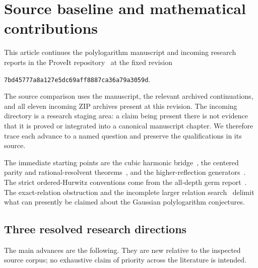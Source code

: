 \documentclass[11pt,a4paper]{article}
\numberwithin{equation}{section}
\theoremstyle{definition}
\theoremstyle{remark}
\newcommand{\snapshot}{\texttt{7bd45777a8a127e5dc69aff8887ca36a79a3059d}}
\begin{document}
\section{Source baseline and mathematical contributions}
\label{intro:scope}

This article continues the polylogarithm manuscript and incoming
research reports in the ProveIt repository~\cite{ProveIt} at the fixed
revision
\begin{center}\snapshot.\end{center}
The source comparison uses the manuscript, the relevant archived
continuations, and all eleven incoming ZIP archives present at this
revision. The incoming directory is a research staging area: a claim
being present there is not evidence that it is proved or integrated
into a canonical manuscript chapter. We therefore trace each advance
to a named question and preserve the qualifications in its source.

The immediate starting points are the cubic harmonic
bridge~\cite{IncomingCubic}, the centered parity and rational-resolvent
theorems~\cite{IncomingParity}, and the higher-reflection
generators~\cite{IncomingReflection}. The strict ordered-Hurwitz
conventions come from the all-depth germ report~\cite{IncomingOrdered}.
The exact-relation obstruction and the incomplete larger relation
search~\cite{IncomingExact,IncomingIndependent} delimit what can
presently be claimed about the Gaussian polylogarithm conjectures.

\subsection{Three resolved research directions}

The main advances are the following. They are new relative to the
inspected source corpus; no exhaustive claim of priority across the
literature is intended.
\end{document}
